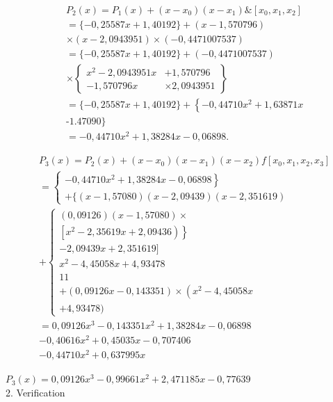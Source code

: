 \documentclass[10pt]{article}
\begin{document}
\[
\begin{aligned}
& P_{2}(x)=P_{1}(x)+\left(x-x_{0}\right)\left(x-x_{1}\right) \&\left[x_{0}, x_{1}, x_{2}\right] \\
& =\{-0,25587 x+1,40192\}+(x-1,570796) \\
& \times(x-2,0943951) \times(-0,4471007537) \\
& =\{-0,25587 x+1,40192\}+(-0,4471007537) \\
& \times\left\{\begin{array}{cc}
x^{2}-2,0943951 x & +1,570796 \\
-1,570796 x & \times 2,0943951
\end{array}\right\} \\
& =\{-0,25587 x+1,40192\}+\left\{-0,44710 x^{2}+1,63871 x\right. \\
& \text {-1.47090\} } \\
& =-0,44710 x^{2}+1,38284 x-0,06898 \text {. }
\end{aligned}
\]

\[
\begin{aligned}
& P_{3}(x)= P_{2}(x)+\left(x-x_{0}\right)\left(x-x_{1}\right)\left(x-x_{2}\right) f\left[x_{0}, x_{1}, x_{2}, x_{3}\right] \\
&=\left\{\begin{array}{l}
\left.-0,44710 x^{2}+1,38284 x-0,06898\right\} \\
+\{(x-1,57080)(x-2,09439)(x-2,351619)
\end{array}\right. \\
&+\left\{\begin{array}{c}
(0,09126)(x-1,57080) \times \\
\left.\left[x^{2}-2,35619 x+2,09436\right)\right\} \\
-2,09439 x+2,351619] \\
x^{2}-4,45058 x+4,93478 \\
11 \\
+(0,09126 x-0,143351) \times\left(x^{2}-4,45058 x\right. \\
+4,93478)
\end{array}\right. \\
&= 0,09126 x^{3}-0,143351 x^{2}+1,38284 x-0,06898 \\
&-0,40616 x^{2}+0,45035 x-0,707406 \\
&-0,44710 x^{2}+0,637995 x
\end{aligned}
\]

\(P_{3}(x)=0,09126 x^{3}-0,99661 x^{2}+2,471185 x-0,77639\)\\
2. Verification
\end{document}
